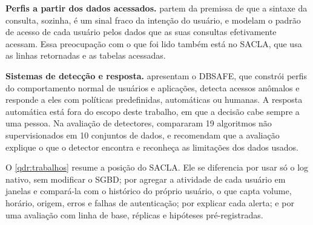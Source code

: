 \textbf{Perfis a partir dos dados acessados.}  partem da premissa de que a
sintaxe da consulta, sozinha, é um sinal fraco da intenção do usuário, e modelam o padrão de
acesso de cada usuário pelos dados que as suas consultas efetivamente acessam. Essa preocupação
com o que foi lido também está no SACLA, que usa as linhas retornadas e as tabelas acessadas.

\textbf{Sistemas de detecção e resposta.}  apresentam o DBSAFE, que
constrói perfis do comportamento normal de usuários e aplicações, detecta acessos anômalos e
responde a eles com políticas predefinidas, automáticas ou humanas. A resposta automática está
fora do escopo deste trabalho, em que a decisão cabe sempre a uma pessoa. Na avaliação de
detectores,  compararam 19 algoritmos não supervisionados em 10
conjuntos de dados, e  recomendam que a avaliação explique o que o
detector encontra e reconheça as limitações dos dados usados.

O \autoref{qdr:trabalhos} resume a posição do SACLA. Ele se diferencia por usar só o log nativo,
sem modificar o SGBD; por agregar a atividade de cada usuário em janelas e compará-la com o
histórico do próprio usuário, o que capta volume, horário, origem, erros e falhas de
autenticação; por explicar cada alerta; e por uma avaliação com linha de base, réplicas e
hipóteses pré-registradas.

